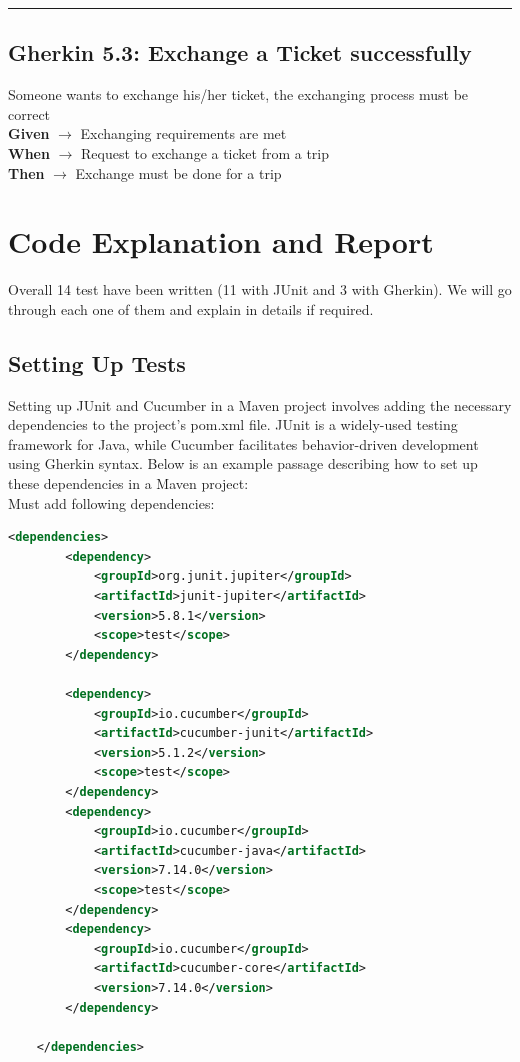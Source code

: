 \documentclass{article}
\begin{document}
\bigskip
\hrule
\bigskip

\subsection{Gherkin 5.3: Exchange a Ticket successfully}

Someone wants to exchange his/her ticket, the exchanging process must be correct\\
\textbf{Given} $\rightarrow$ Exchanging requirements are met \\
\textbf{When} $\rightarrow$ Request to exchange a ticket from a trip \\
\textbf{Then} $\rightarrow$ Exchange must be done for a trip

\pagebreak


\section{Code Explanation and Report}
 Overall 14 test have been written (11 with JUnit and 3 with Gherkin). We will go through each one of them and explain in details if required.

 \bigskip

 \subsection{Setting Up Tests}
Setting up JUnit and Cucumber in a Maven project involves adding the necessary dependencies to the project's pom.xml file. JUnit is a widely-used testing framework for Java, while Cucumber facilitates behavior-driven development using Gherkin syntax. Below is an example passage describing how to set up these dependencies in a Maven project:\\

Must add following dependencies:
 \begin{codebox}
 \begin{lstlisting}[language=xml]
        <dependencies>
        <dependency>
            <groupId>org.junit.jupiter</groupId>
            <artifactId>junit-jupiter</artifactId>
            <version>5.8.1</version>
            <scope>test</scope>
        </dependency>

        <dependency>
            <groupId>io.cucumber</groupId>
            <artifactId>cucumber-junit</artifactId>
            <version>5.1.2</version>
            <scope>test</scope>
        </dependency>
        <dependency>
            <groupId>io.cucumber</groupId>
            <artifactId>cucumber-java</artifactId>
            <version>7.14.0</version>
            <scope>test</scope>
        </dependency>
        <dependency>
            <groupId>io.cucumber</groupId>
            <artifactId>cucumber-core</artifactId>
            <version>7.14.0</version>
        </dependency>

    </dependencies>

 \end{lstlisting}
 \end{codebox}
\end{document}
